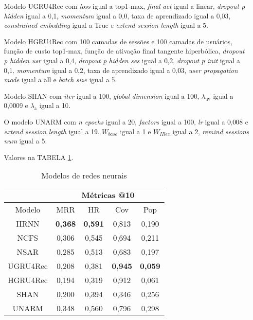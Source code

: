 Modelo UGRU4Rec com \textit{loss} igual a top1-max, \textit{final act} igual a
linear, \textit{dropout p hidden} igual a 0,1, \textit{momentum} igual a 0,0,
taxa de aprendizado igual a 0,03, \textit{constrained embedding} igual a True e
\textit{extend session length} igual a 5.

Modelo HGRU4Rec com 100 camadas de sessões e 100 camadas de usuários, função de
custo top1-max, função de ativação final tangente hiperbólica,
\textit{dropout p hidden usr} igual a 0,4, \textit{dropout p hidden ses} igual a
0,2, \textit{dropout p init} igual a 0,1, \textit{momentum} igual a 0,2, taxa de
aprendizado igual a 0,03, \textit{user propagation mode} igual a all e
\textit{batch size} igual a 5.


Modelo SHAN com \textit{iter} igual a 100, \textit{global dimension} igual a
100, $\lambda_{\text{uv}}$ igual a 0,0009 e $\lambda_{\text{a}}$ igual a 10.

O modelo UNARM com \textit{n epochs} igual a 20, \textit{factors} igual a 100,
\textit{lr} igual a 0,008 e \textit{extend session length} igual a 19. $W_{base}$
igual a 1 e $W_{IRec}$ igual a 2, \textit{remind sessions num} igual a 5.

Valores na TABELA \ref{app:nn_models_aware}.

\begin{table}
  \centering
  \begin{tabular}{|c|c|c|c|c|}
    \hline
      \multicolumn{1}{|c|}{} & \multicolumn{4}{c|}{Métricas @10} \\
      \hline
      Modelo & MRR & HR & Cov & Pop \\
      \hline
      IIRNN & \textbf{0,368} & \textbf{0,591} & 0,813 & 0,190 \\
      \hline
      NCFS & 0,306 & 0,545 & 0,694 & 0,211 \\
      \hline
      NSAR & 0,285 & 0,513 & 0,683 & 0,197 \\
      \hline
      UGRU4Rec & 0,208 & 0,381 & \textbf{0,945} & \textbf{0,059} \\
      \hline
      HGRU4Rec & 0,194 & 0,319 & 0,912 & 0,061 \\ 
      \hline
      SHAN & 0,200 & 0,394 & 0,346 & 0,256 \\
      \hline
      UNARM & 0,348 & 0,560 & 0,796 & 0,298 \\
      \hline
      \end{tabular}
      \caption{Modelos de redes neurais}
      \label{app:nn_models_aware}
\end{table}

